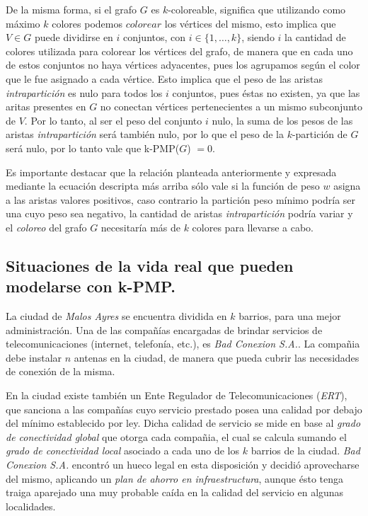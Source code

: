 De la misma forma, si el grafo $G$ es $k$-coloreable, significa que utilizando
como máximo $k$ colores podemos $colorear$ los vértices del mismo, esto implica
que $V \in G$ puede dividirse en $i$ conjuntos, con $i \in \{1, \dots, k\}$, siendo $i$ la cantidad de colores utilizada para colorear los vértices del grafo, de manera que en cada uno de estos conjuntos no haya vértices adyacentes, pues los agrupamos según el color que le fue asignado a cada vértice. Esto implica que el peso de las aristas \textit{intrapartición} es nulo para todos los $i$ conjuntos, pues éstas no existen, ya que las aritas presentes en $G$ no conectan vértices pertenecientes a un mismo subconjunto de $V$. Por lo tanto, al ser el peso del conjunto $i$ nulo, la suma de los pesos de las aristas \textit{intrapartición} será también nulo, por lo que el peso de la $k$-partición de $G$ será nulo, por lo tanto vale que k-PMP($G$) $= 0$.

Es importante destacar que la relación planteada anteriormente y expresada mediante la ecuación descripta más arriba sólo vale si la función de peso $w$ asigna a las aristas valores positivos, caso contrario la partición peso mínimo podría ser una cuyo peso sea negativo, la cantidad de aristas \textit{intrapartición} podría variar y el \textit{coloreo} del grafo $G$ necesitaría más de $k$ colores para llevarse a cabo.



\newpage
\subsection{Situaciones de la vida real que pueden modelarse con k-PMP.}
\vspace*{0.3cm}

La ciudad de \textit{Malos Ayres} se encuentra dividida en $k$ barrios, para una mejor administración. Una de las compañías encargadas de brindar servicios de telecomunicaciones (internet, telefonía, etc.), es \textit{Bad Conexion S.A.}.
La compañia debe instalar $n$ antenas en la ciudad, de manera que pueda cubrir las necesidades de conexión de la misma.

En la ciudad existe también un Ente Regulador de Telecomunicaciones (\textit{ERT}), que sanciona a las compañías cuyo servicio prestado posea una calidad por debajo del mínimo establecido por ley. Dicha calidad de servicio se mide en base al \textit{grado de conectividad global} que otorga cada compañia, el cual se calcula sumando el \textit{grado de conectividad local} asociado a cada uno de los $k$ barrios de la ciudad. \textit{Bad Conexion S.A.} encontró un hueco legal en esta disposición y decidió aprovecharse del mismo, aplicando un \textit{plan de ahorro en infraestructura}, aunque ésto tenga traiga aparejado una muy probable caída en la calidad del servicio en algunas localidades.

